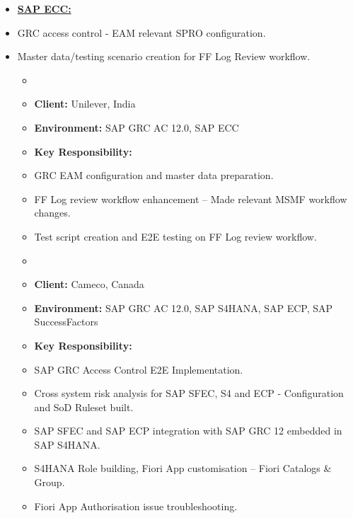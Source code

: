 \documentclass[10pt]{article}
\begin{document}
\begin{itemize}
	\small
    	\item[] \textbf{\underline{SAP ECC:}} 
			\item GRC access control - EAM relevant SPRO configuration.
    		\item Master data/testing scenario creation for FF Log Review workflow.

		
    \begin{itemize}
        \item[]  
        	\item[\ding{226}] \textbf {Client:} Unilever, India
        	\item[] \textbf {Environment: } SAP GRC AC 12.0, SAP ECC
    \end{itemize}
    
    \begin{itemize}
        \item[] \textbf {Key Responsibility:}
        	\item GRC EAM configuration and master data preparation.
        	\item FF Log review workflow enhancement – Made relevant MSMF workflow changes.
    		\item Test script creation and E2E testing on FF Log review workflow.
    \end{itemize}  
     
    \begin{itemize}
        \item[]  
        	\item[\ding{226}] \textbf {Client:} Cameco, Canada
        	\item[] \textbf {Environment: } SAP GRC AC 12.0, SAP S4HANA, SAP ECP, SAP SuccessFactors
    \end{itemize}

    \begin{itemize}
        \item[] \textbf {Key Responsibility:}
			\item SAP GRC Access Control E2E Implementation.
			\item Cross system risk analysis for SAP SFEC, S4 and ECP - Configuration and SoD Ruleset built.
			\item SAP SFEC and SAP ECP integration with SAP GRC 12 embedded in SAP S4HANA.
			\item S4HANA Role building, Fiori App customisation – Fiori Catalogs \& Group.
			\item Fiori App Authorisation issue troubleshooting.
    \end{itemize}
     

\end{itemize}
\end{document}
